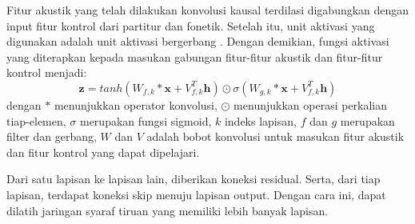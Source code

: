 Fitur akustik yang telah dilakukan konvolusi kausal terdilasi digabungkan dengan input fitur kontrol dari partitur dan fonetik. Setelah itu, unit aktivasi yang digunakan adalah unit aktivasi bergerbang \parencite{Oord2016ConditionalIG}. Dengan demikian, fungsi aktivasi yang diterapkan kepada masukan gabungan fitur-fitur akustik dan fitur-fitur kontrol menjadi:
\begin{equation}
    \mathbf{z} = tanh(W_{f,k}*\mathbf{x}+V^T_{f,k}\mathbf{h})\odot\sigma(W_{g,k}*\mathbf{x}+V^T_{f,k}\mathbf{h})
\end{equation}\label{eq-gated-activation}
dengan $*$ menunjukkan operator konvolusi, $\odot$ menunjukkan operasi perkalian tiap-elemen, $\sigma$ merupakan fungsi sigmoid, $k$ indeks lapisan, $f$ dan $g$ merupakan filter dan gerbang, $W$ dan $V$ adalah bobot konvolusi untuk masukan fitur akustik dan fitur kontrol yang dapat dipelajari.

Dari satu lapisan ke lapisan lain, diberikan koneksi residual. Serta, dari tiap lapisan, terdapat koneksi skip menuju lapisan output. Dengan cara ini, dapat dilatih jaringan syaraf tiruan yang memiliki lebih banyak lapisan. \parencite{He2016DeepRL}

